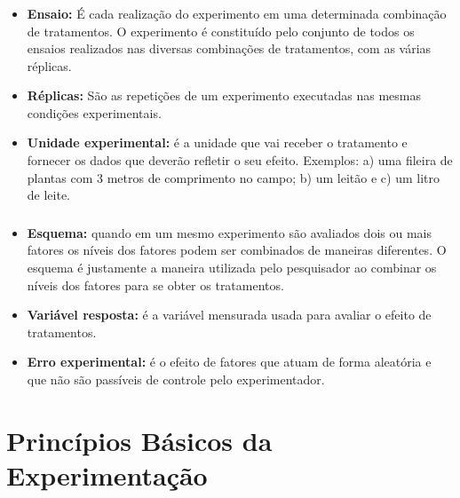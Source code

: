 \documentclass[14pt,aspectratio=1610]{beamer}
\begin{document}
\begin{frame}{}
\frametitle{}
\begin{block}{}
\justifying
\begin{itemize}
\item {\bf Ensaio:} É cada realização do experimento em uma determinada combinação de tratamentos. O experimento é constituído pelo conjunto de todos os ensaios realizados nas diversas combinações de tratamentos, com as várias réplicas.\pause
\item {\bf Réplicas:} São as repetições de um experimento executadas nas mesmas condições experimentais.\pause
\item {\bf Unidade experimental:} é a unidade que vai receber o tratamento e fornecer os dados que deverão refletir o seu efeito. Exemplos: a) uma fileira de plantas com 3
metros de comprimento no campo; b) um leitão e c) um litro de leite.
\end{itemize}
\end{block}
\end{frame}

\begin{frame}{}
\frametitle{}
\begin{block}{}
\begin{itemize}
\item {\bf Esquema:} quando em um mesmo experimento são avaliados dois ou mais fatores
os níveis dos fatores podem ser combinados de maneiras diferentes. O esquema é
justamente a maneira utilizada pelo pesquisador ao combinar os níveis dos fatores
para se obter os tratamentos.\pause
\item {\bf Variável resposta:} é a variável mensurada usada para avaliar o efeito de
tratamentos.\pause
\item {\bf Erro experimental:} é o efeito de fatores que atuam de forma aleatória e 
que não são passíveis de controle pelo experimentador.
\end{itemize}
\end{block}
\end{frame}

\section{Princípios Básicos da Experimentação}
\end{document}
